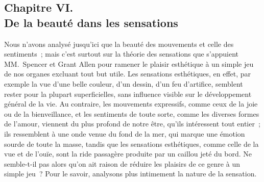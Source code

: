 \documentclass[french,twoside]{book} %
\begin{document}
\subsection[{Chapitre VI. De la beauté dans les sensations}]{Chapitre VI. \\
De la beauté dans les sensations}
\noindent  Nous n’avons analysé jusqu’ici que la beauté des mouvements et celle des sentiments ; mais c’est surtout sur la théorie des sensations que s’appuient MM. Spencer et Grant Allen pour ramener le plaisir esthétique à un simple jeu de nos organes excluant tout but utile. Les sensations esthétiques, en effet, par exemple la vue d’une belle couleur, d’un dessin, d’un feu d’artifice, semblent rester pour la plupart superficielles, sans influence visible sur le développement général de la vie. Au contraire, les mouvements expressifs, comme ceux de la joie ou de la bienveillance, et les sentiments de toute sorte, comme les diverses formes de l’amour, viennent du plus profond de notre être, qu’ils intéressent tout entier ; ils ressemblent à une onde venue du fond de la mer, qui marque une émotion sourde de toute la masse, tandis que les sensations esthétiques, comme celle de la vue et de l’ouïe, sont la ride passagère produite par un caillou jeté du bord. Ne semble-t-il pas alors qu’on ait raison de réduire les plaisirs de ce  genre à un simple jeu ? Pour le savoir, analysons plus intimement la nature de la sensation.\par
\end{document}
